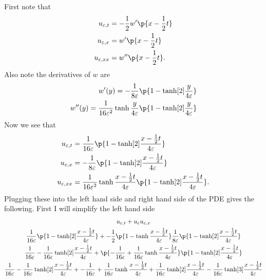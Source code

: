 \documentclass[11pt, oneside]{article}
\begin{document}
\begin{enumerate}
    First note that
    \begin{align*}
      u_{\varepsilon, t} &= -\frac{1}{2} w'\p{x - \frac{1}{2}t} \\
      u_{\varepsilon, x} &= w'\p{x - \frac{1}{2}t} \\
      u_{\varepsilon, xx} &= w''\p{x - \frac{1}{2}t}.
    \end{align*}
    Also note the derivatives of $w$ are
    \begin{align*}
      w'(y) = -\frac{1}{8\varepsilon} \p{1 - \tanh[2]{\frac{y}{4\varepsilon}}} \\
      w''(y) = \frac{1}{16\varepsilon^2} \tanh{\frac{y}{4\varepsilon}} \p{1 - \tanh[2]{\frac{y}{4\varepsilon}}} \\
    \end{align*}
    Now we see that
    \begin{align*}
      u_{\varepsilon, t} &= \frac{1}{16\varepsilon} \p{1 - \tanh[2]{\frac{x - \frac{1}{2}t}{4\varepsilon}}}\\
      u_{\varepsilon, x} &= -\frac{1}{8\varepsilon} \p{1 - \tanh[2]{\frac{x - \frac{1}{2}t}{4\varepsilon}}} \\
      u_{\varepsilon, xx} &= \frac{1}{16\varepsilon^2} \tanh{\frac{x - \frac{1}{2}t}{4\varepsilon}} \p{1 - \tanh[2]{\frac{x - \frac{1}{2}t}{4\varepsilon}}}.
    \end{align*}
    Plugging these into the left hand side and right hand side of the PDE gives the following.
    First I will simplify the left hand side
    \begin{gather*}
      u_{\varepsilon, t} + u_{\varepsilon} u_{\varepsilon, x} \\
      \frac{1}{16\varepsilon} \p{1 - \tanh[2]{\frac{x - \frac{1}{2}t}{4\varepsilon}}} + -\frac{1}{2}\p{1 - \tanh{\frac{x - \frac{1}{2}t}{4\varepsilon}}}\frac{1}{8\varepsilon} \p{1 - \tanh[2]{\frac{x - \frac{1}{2}t}{4\varepsilon}}} \\
      \frac{1}{16\varepsilon} - \frac{1}{16\varepsilon}\tanh[2]{\frac{x - \frac{1}{2}t}{4\varepsilon}} + \p{-\frac{1}{16\varepsilon} + \frac{1}{16\varepsilon}\tanh{\frac{x - \frac{1}{2}t}{4\varepsilon}}} \p{1 - \tanh[2]{\frac{x - \frac{1}{2}t}{4\varepsilon}}} \\
      \frac{1}{16\varepsilon} - \frac{1}{16\varepsilon}\tanh[2]{\frac{x - \frac{1}{2}t}{4\varepsilon}} + -\frac{1}{16\varepsilon} + \frac{1}{16\varepsilon}\tanh{\frac{x - \frac{1}{2}t}{4\varepsilon}} + \frac{1}{16\varepsilon}\tanh[2]{\frac{x - \frac{1}{2}t}{4\varepsilon}} - \frac{1}{16\varepsilon}\tanh[3]{\frac{x - \frac{1}{2}t}{4\varepsilon}} \\

\end{gather*}
\end{enumerate}
\end{document}
